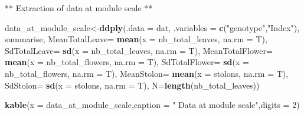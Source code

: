 \documentclass[]{article}
\newenvironment{Shaded}{\begin{snugshade}}{\end{snugshade}}
\newcommand{\KeywordTok}[1]{\textcolor[rgb]{0.13,0.29,0.53}{\textbf{#1}}}
\newcommand{\DataTypeTok}[1]{\textcolor[rgb]{0.13,0.29,0.53}{#1}}
\newcommand{\DecValTok}[1]{\textcolor[rgb]{0.00,0.00,0.81}{#1}}
\newcommand{\StringTok}[1]{\textcolor[rgb]{0.31,0.60,0.02}{#1}}
\newcommand{\NormalTok}[1]{#1}
\begin{document}
** Extraction of data at module scale **

\begin{Shaded}
\begin{Highlighting}[]
\NormalTok{data_at_module_scale<-}\KeywordTok{ddply}\NormalTok{(}\DataTypeTok{.data =}\NormalTok{ dat,}
                            \DataTypeTok{.variables =} \KeywordTok{c}\NormalTok{(}\StringTok{"genotype"}\NormalTok{,}\StringTok{"Index"}\NormalTok{),}
\NormalTok{                            summarise,}
                            \DataTypeTok{MeanTotalLeave=} \KeywordTok{mean}\NormalTok{(}\DataTypeTok{x =}\NormalTok{ nb_total_leaves,}
                                                 \DataTypeTok{na.rm =}\NormalTok{ T),}
                            \DataTypeTok{SdTotalLeave=} \KeywordTok{sd}\NormalTok{(}\DataTypeTok{x =}\NormalTok{ nb_total_leaves,}
                                             \DataTypeTok{na.rm =}\NormalTok{ T),}
                            \DataTypeTok{MeanTotalFlower=} \KeywordTok{mean}\NormalTok{(}\DataTypeTok{x =}\NormalTok{ nb_total_flowers,}
                                                  \DataTypeTok{na.rm =}\NormalTok{ T),}
                            \DataTypeTok{SdTotalFlower=} \KeywordTok{sd}\NormalTok{(}\DataTypeTok{x =}\NormalTok{ nb_total_flowers,}
                                              \DataTypeTok{na.rm =}\NormalTok{ T),}
                            \DataTypeTok{MeanStolon=} \KeywordTok{mean}\NormalTok{(}\DataTypeTok{x =}\NormalTok{ stolons,}
                                             \DataTypeTok{na.rm =}\NormalTok{ T),}
                            \DataTypeTok{SdStolon=} \KeywordTok{sd}\NormalTok{(}\DataTypeTok{x =}\NormalTok{ stolons,}
                                         \DataTypeTok{na.rm =}\NormalTok{ T),}
                            \DataTypeTok{N=}\KeywordTok{length}\NormalTok{(nb_total_leaves))}

\KeywordTok{kable}\NormalTok{(}\DataTypeTok{x =}\NormalTok{ data_at_module_scale,}\DataTypeTok{caption =} \StringTok{" Data at module scale"}\NormalTok{,}\DataTypeTok{digits =} \DecValTok{2}\NormalTok{)}
\end{Highlighting}
\end{Shaded}
\end{document}
